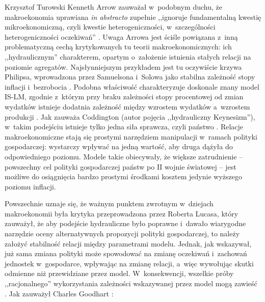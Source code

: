 \begin{artplenv}{Krzysztof Turowski}
Kenneth Arrow zauważał w~podobnym duchu, że makroekonomia uprawiana \textit{in abstracto} zupełnie ,,ignoruje
fundamentalną kwestię mikroekonomiczną, czyli kwestie heterogeniczności, w~szczególności heterogeniczności oczekiwań''
\parencite{colander_changing_2004}.
Uwaga Arrowa jest ściśle powiązana z~inną problematyczną cechą
krytykowanych tu teorii makroekonomicznych: ich ,,hydraulicznym'' charakterem, opartym o~założenie istnienia stałych
relacji na poziomie agregatów. Najsłynniejszym przykładem jest tu oczywiście krzywa Philipsa, wprowadzona przez
Samuelsona i~Solowa jako stabilna zależność stopy inflacji i~bezrobocia
\parencite{samuelson_analytical_1960}.
Podobna właściwość charakteryzuje doskonale znany model IS-LM, zgodnie z~którym przy braku zależności stopy
procentowej od zmian wydatków istnieje dodatnia zależność między wzrostem wydatków a~wzrostem produkcji
\parencite{hicks_mr._1937}.
Jak zauważa Coddington (autor pojęcia ,,hydrauliczny Keynesizm''), w~takim
podejściu istnieje tylko jedna siła sprawcza, czyli państwo
\parencite{coddington_keynesian_1976}.
Relacje
makroekonomiczne stają się prostymi narzędziem manipulacji w~ramach polityki gospodarczej: wystarczy wpływać na jedną
wartość, aby druga dążyła do odpowiedniego poziomu. Modele takie obiecywały, że większe zatrudnienie  -- 
powszechny cel polityki gospodarczej państw po II wojnie światowej
\parencite{robinson_second_1972}
 -- jest możliwe do osiągnięcia bardzo prostymi środkami kosztem jedynie wyższego poziomu inflacji.

Powszechnie uznaje się, że ważnym punktem zwrotnym w~dziejach makroekonomii była krytyka przeprowadzona przez Roberta
Lucasa, który zauważył, że aby podejście hydrauliczne było poprawne i~dawało wiarygodne narzędzie oceny alternatywnych
propozycji polityki gospodarczej, to należy założyć stabilność relacji między parametrami modelu. Jednak, jak
wskazywał, już sama zmiana polityki może spowodować na zmianę oczekiwań i~zachowań jednostek w~gospodarce, wpływając na
zmianę relacji, a~więc wywołując skutki odmienne niż przewidziane przez model. W~konsekwencji, wszelkie próby
,,racjonalnego'' wykorzystania zależności wskazywanej przez model mogą zawieść
\parencite{lucas_econometric_1976}.
Jak zauważył Charles Goodhart
\parencite*[s.~116]{goodhart_problems_1984}:


\end{artplenv}
